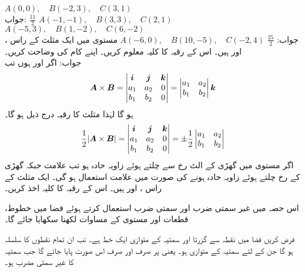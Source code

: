 $A(0,0),\quad B(-2,3),\quad C(3,1)$\\
جواب:\quad
$\tfrac{11}{2}$
$A(-1,-1),\quad B(3,3),\quad C(2,1)$
$A(-5,3),\quad B(1,-2),\quad C(6,-2)$\\
جواب:\quad
$\tfrac{25}{2}$
$A(-6,0),\quad B(10,-5),\quad C(-2,4)$
مستوی  میں ایک مثلث کے راس ،  اور  ہیں۔ اس کے رقبہ کا کلیہ معلوم کریں۔ اپنے کام کی وضاحت کریں۔\\
جواب:\quad
اگر  اور  ہوں تب
\begin{align*}
{\ensuremath{{\boldsymbol{A}}}}\times{\ensuremath{{\boldsymbol{B}}}}=\begin{vmatrix} {\boldsymbol{i}}&{\boldsymbol{j}}&{\boldsymbol{k}}\\ a_1&a_2&0\\b_1&b_2&0 \end{vmatrix}=
\begin{vmatrix}a_1&a_2\\b_1&b_2 \end{vmatrix}{\boldsymbol{k}}
\end{align*}
ہو گا لہٰذا مثلث کا رقبہ درج ذیل ہو گا۔
 \begin{align*}
\frac{1}{2}\abs{{{\boldsymbol{A}}}\times{\ensuremath{{\boldsymbol{B}}}}}=\begin{vmatrix} {\boldsymbol{i}}&{\boldsymbol{j}}&{\boldsymbol{k}}\\ a_1&a_2&0\\b_1&b_2&0 \end{vmatrix}=
\pm \frac{1}{2}\begin{vmatrix}a_1&a_2\\b_1&b_2 \end{vmatrix}
\end{align*}
اگر مستوی میں گھڑی کے الٹ رخ  سے  چلتے ہوئے  زاویہ حادہ  ہو تب  علامت جبکہ گھڑی کے رخ چلتے ہوئے زاویہ حادہ ہونے کی صورت میں  علامت استعمال ہو گی۔
ایک مثلث کے راس ،  اور  ہیں۔ اس کے رقبہ کا کلیہ اخذ کریں۔ 

اس حصہ میں غیر سمتی ضرب اور سمتی ضرب استعمال کرتے ہوئے فضا میں خطوط، قطعات اور مستوی کے مساوات لکھنا سکھایا جائے گا۔

فرض کریں فضا میں نقطہ  سے گزرتا اور سمتیہ  کے متوازی ایک خط  ہے۔ تب  ان تمام نقطوں  کا سلسلہ ہو گا جن کے لئے  سمتیہ  کے متوازی ہو۔ یعنی  پر  صرف اور صرف اس صورت پایا جائے گا جب  سمتیہ  کا غیر سمتی مضرب ہو۔ 

